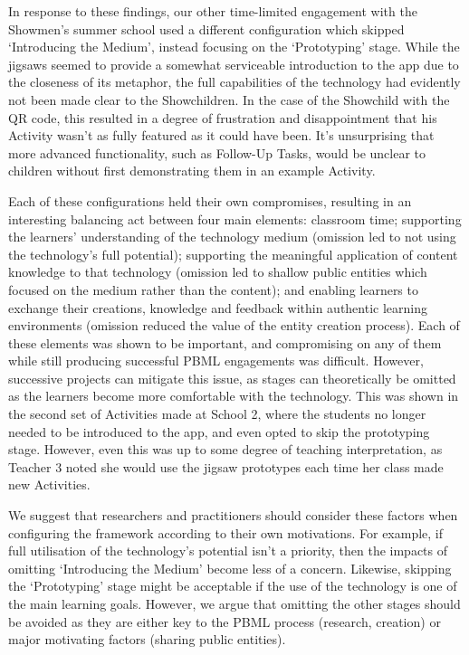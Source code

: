 \documentclass[,hyphens]{sigchi}
\begin{document}
In response to these findings, our other time-limited engagement with the Showmen's summer school used a different configuration which skipped `Introducing the Medium', instead focusing on the `Prototyping' stage. While the jigsaws seemed to provide a somewhat serviceable introduction to the app due to the closeness of its metaphor, the full capabilities of the technology had evidently not been made clear to the Showchildren. In the case of the Showchild with the QR code, this resulted in a degree of frustration and disappointment that his Activity wasn't as fully featured as it could have been. It's unsurprising that more advanced functionality, such as Follow-Up Tasks, would be unclear to children without first demonstrating them in an example Activity.

Each of these configurations held their own compromises, resulting in an interesting balancing act between four main elements: classroom time; supporting the learners' understanding of the technology medium (omission led to not using the technology's full potential); supporting the meaningful application of content knowledge to that technology (omission led to shallow public entities which focused on the medium rather than the content); and enabling learners to exchange their creations, knowledge and feedback within authentic learning environments (omission reduced the value of the entity creation process). Each of these elements was shown to be important, and compromising on any of them while still producing successful PBML engagements was difficult. However, successive projects can mitigate this issue, as stages can theoretically be omitted as the learners become more comfortable with the technology. This was shown in the second set of Activities made at School 2, where the students no longer needed to be introduced to the app, and even opted to skip the prototyping stage. However, even this was up to some degree of teaching interpretation, as Teacher 3 noted she would use the jigsaw prototypes each time her class made new Activities. 

We suggest that researchers and practitioners should consider these factors when configuring the framework according to their own motivations. For example, if full utilisation of the technology's potential isn't a priority, then the impacts of omitting `Introducing the Medium' become less of a concern. Likewise, skipping the `Prototyping' stage might be acceptable if the use of the technology is one of the main learning goals. However, we argue that omitting the other stages should be avoided as they are either key to the PBML process (research, creation) or major motivating factors (sharing public entities).
\end{document}
